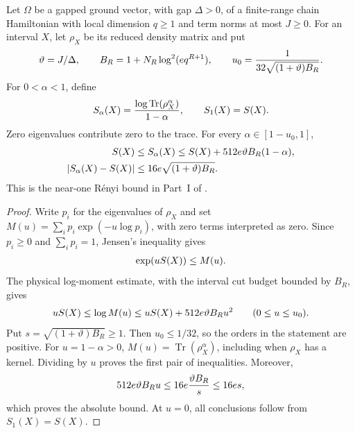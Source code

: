 \begin{lemma}
    \label{thm:chain_renyi_near_one}
    \leanok
    Let $\Omega$ be a gapped ground vector, with gap $\Delta>0$, of a
    finite-range chain Hamiltonian with local dimension $q\ge1$ and term
    norms at most $J\ge0$. For an interval $X$, let $\rho_X$ be its reduced
    density matrix and put
    \begin{align}
        \vartheta=J/\Delta,\qquad
        B_R=1+N_R\log^2(e q^{R+1}),\qquad
        u_0=\frac1{32\sqrt{(1+\vartheta)B_R}}.\notag
    \end{align}
    For $0<\alpha<1$, define
    \begin{align}
        S_\alpha(X)=\frac{\log\operatorname{Tr}(\rho_X^\alpha)}{1-\alpha},
        \qquad S_1(X)=S(X).\notag
    \end{align}
    Zero eigenvalues contribute zero to the trace. For every
    $\alpha\in[1-u_0,1]$,
    \begin{align}
        S(X)               & \le S_\alpha(X)
        \le S(X)+512e\vartheta B_R(1-\alpha),\notag               \\
        |S_\alpha(X)-S(X)| & \le16e\sqrt{(1+\vartheta)B_R}.\notag
    \end{align}
    This is the near-one Rényi bound in Part~I of
    \cite{TNLean2026OneDimensional}.
\end{lemma}
\begin{proof}
    \leanok
    Write $p_i$ for the eigenvalues of $\rho_X$ and set
    $M(u)=\sum_i p_i\exp(-u\log p_i)$, with zero terms interpreted as zero.
    Since $p_i\ge0$ and $\sum_i p_i=1$, Jensen's inequality gives
    \begin{align}
        \exp(uS(X))\le M(u).\notag
    \end{align}
    The physical log-moment estimate, with the interval cut budget bounded
    by $B_R$, gives
    \begin{align}
        uS(X)\le\log M(u)
        \le uS(X)+512e\vartheta B_Ru^2
        \qquad(0\le u\le u_0).\notag
    \end{align}
    Put $s=\sqrt{(1+\vartheta)B_R}\ge1$. Then $u_0\le1/32$, so the
    orders in the statement are positive. For $u=1-\alpha>0$,
    $M(u)=\operatorname{Tr}(\rho_X^\alpha)$, including when $\rho_X$
    has a kernel. Dividing by $u$ proves the first pair of inequalities.
    Moreover,
    \begin{align}
        512e\vartheta B_Ru
        \le16e\frac{\vartheta B_R}{s}
        \le16es,\notag
    \end{align}
    which proves the absolute bound. At $u=0$, all conclusions follow
    from $S_1(X)=S(X)$.
\end{proof}

